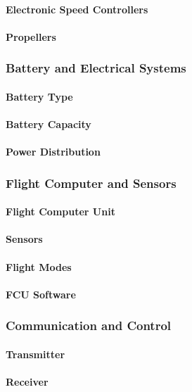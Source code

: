 \paragraph{Electronic Speed Controllers}
\paragraph{Propellers}

\subsubsection{Battery and Electrical Systems}
\paragraph{Battery Type}
\paragraph{Battery Capacity}
\paragraph{Power Distribution}

\subsubsection{Flight Computer and Sensors}
\paragraph{Flight Computer Unit}
\paragraph{Sensors}
\paragraph{Flight Modes}
\paragraph{FCU Software}

\subsubsection{Communication and Control}
\paragraph{Transmitter}
\paragraph{Receiver}
